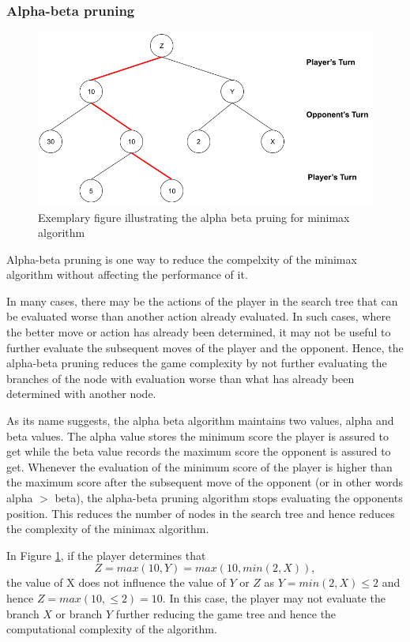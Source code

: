 \subsubsection{Alpha-beta pruning}

\begin{figure}[!ht]
    \centering
    \includegraphics[width=\linewidth]{../img/Minimax2.png}
    \caption{Exemplary figure illustrating the alpha beta pruing for minimax algorithm}
    \label{fig:minimax2}
\end{figure}

Alpha-beta pruning is one way to reduce the compelxity of the minimax algorithm without affecting the performance of it.

In many cases, there may be the actions of the player in the search tree that can be evaluated worse than another action already evaluated. In such cases, where the better move or action has already been determined, it may not be useful to further evaluate the subsequent moves of the player and the opponent. Hence, the alpha-beta pruning reduces the game complexity by not further evaluating the branches of the node with evaluation worse than what has already been determined with another node.

As its name suggests, the alpha beta algorithm maintains two values, alpha and beta values. The alpha value stores the minimum score the player is assured to get while the beta value records the maximum score the opponent is assured to get. Whenever the evaluation of the minimum score of the player is higher than the maximum score after the subsequent move of the opponent (or in other words alpha $>$ beta), the alpha-beta pruning algorithm stops evaluating the opponents position. This reduces the number of nodes in the search tree and hence reduces the complexity of the minimax algorithm.

In Figure \ref{fig:minimax2}, if the player determines that 
\begin{equation}
    Z = max (10, Y) = max (10,  min (2, X)),
\end{equation}
the value of X does not influence the value of $Y$ or $Z$ as $Y = min(2, X) \leq 2$ and hence $Z = max(10, \leq 2) = 10$. In this case, the player may not evaluate the branch $X$ or branch $Y$ further reducing the game tree and hence the computational complexity of the algorithm. 

